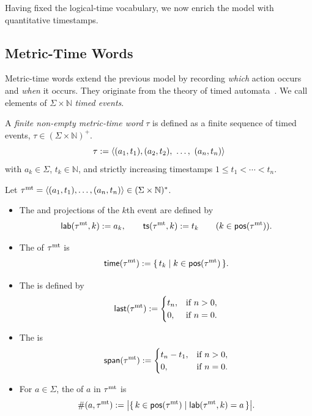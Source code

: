 Having fixed the logical-time vocabulary, we now enrich the model with quantitative timestamps.


\subsection{Metric-Time Words}

Metric-time words extend the previous model by recording \emph{which} action occurs and \emph{when} it occurs. They originate from the theory of timed automata~\cite{DBLP:journals/tcs/AlurD94}. We call elements of \(\Sigma\times\mathbb{N}\) \emph{timed events}.

\begin{definition} \label{timedwords} 
    A \emph{finite non-empty metric-time word} $\tau$ is defined as a finite sequence of timed events, $\tau \in (\Sigma\times\mathbb{N})^+$.
     \[\tau := \trace{(a_1,t_1), (a_2,t_2), \ \dots, \ (a_{n},t_{n}) }\]
     with \(a_k\in\Sigma\), \(t_k\in\mathbb{N}\), and strictly increasing timestamps \(1\le t_1<\cdots<t_{n}\).
\end{definition}

\begin{definition}
  Let $\tau^{\mathrm{mt}}=\langle (a_1,t_1),\dots,(a_{n},t_{n}) \rangle \in(\Sigma\times\mathbb{N})^{*}$.
  \begin{itemize}
    \item The  and  projections of the $k$th event are defined by
    \[
      \mathsf{lab}(\tau^{\mathrm{mt}},k):=a_k,\qquad \mathsf{ts}(\tau^{\mathrm{mt}},k):=t_k\qquad (k\in\mathsf{pos}(\tau^{\mathrm{mt}})).
    \]
    \item The  of $\tau^{\mathrm{mt}}$ is
    \[
      \mathsf{time}(\tau^{\mathrm{mt}}):=\{\, t_k \mid k\in\mathsf{pos}(\tau^{\mathrm{mt}})\,\}.
    \]
    \item The  is defined by
    \[
      \mathsf{last}(\tau^{\mathrm{mt}}):=
      \begin{cases}
        t_n, & \text{if } n>0,\\
        0, & \text{if } n=0.
      \end{cases}
    \]
    \item The  is
    \[
      \mathsf{span}(\tau^{\mathrm{mt}}):=
      \begin{cases}
        t_n-t_1, & \text{if } n>0,\\
        0, & \text{if } n=0.
      \end{cases}
    \]
    \item For $a\in\Sigma$, the  of $a$ in $\tau^{\mathrm{mt}}$ is
    \[
      \#(a,\tau^{\mathrm{mt}}):=\big|\{\, k\in\mathsf{pos}(\tau^{\mathrm{mt}}) \mid \mathsf{lab}(\tau^{\mathrm{mt}},k)=a \,\}\big|.
    \]
  \end{itemize}
\end{definition}

